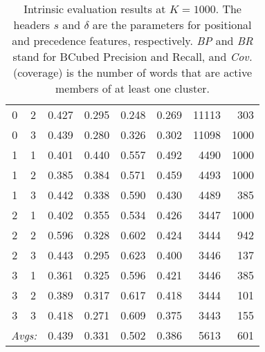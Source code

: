 \begin{table}[!h]
{\begin{tabular}{cc|ccccrr}
0 & 2 & 0.427 & 0.295 & 0.248 & 0.269 & 11113 & 303 \\%
0 & 3 & 0.439 & 0.280 & 0.326 & 0.302 & 11098 & 1000 \\ \hline %
1 & 1 & 0.401 & 0.440 & 0.557 & 0.492 & 4490 & 1000 \\%
1 & 2 & 0.385 & 0.384 & 0.571 & 0.459 & 4493 & 1000 \\%
1 & 3 & 0.442 & 0.338 & 0.590 & 0.430 & 4489 & 385 \\ \hline %
2 & 1 & 0.402 & 0.355 & 0.534 & 0.426 & 3447 & 1000 \\%
2 & 2 & 0.596 & 0.328 & 0.602 & 0.424 & 3444 & 942 \\%
2 & 3 & 0.443 & 0.295 & 0.623 & 0.400 & 3446 & 137 \\ \hline %
3 & 1 & 0.361 & 0.325 & 0.596 & 0.421 & 3446 & 385 \\
3 & 2 & 0.389 & 0.317 & 0.617 & 0.418 & 3444 & 101 \\%
3 & 3 & 0.418 & 0.271 & 0.609 & 0.375 & 3443 & 155 \\ \hline \hline%
 \multicolumn{2}{r|}{\textit{Avgs:}} & 0.439 & 0.331 & 0.502 & 0.386 & 5613 & 601 \\
\end{tabular}
\label{subtab:intr-O-1000}
}
\caption{Intrinsic evaluation results at $K = 1000$. The headers $s$ and $\delta$ are the parameters for positional and precedence features, respectively. \textit{BP} and \textit{BR} stand for BCubed Precision and Recall, and \textit{Cov.} (coverage) is the number of words that are active members of at least one cluster.}
\label{tab:intr-1000}
\end{table}

